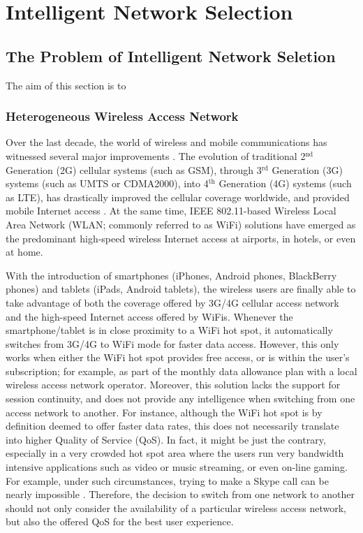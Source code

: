 \chapter{Intelligent Network Selection} %
\label{cha:intelligent}

\minitoc
\vspace{10mm}

\section{The Problem of Intelligent Network Seletion} %
\label{sec:the_problem_of_intelligent_network_seletion_intelligent}
The aim of this section is to 

\subsection{Heterogeneous Wireless Access Network} %
\label{sub:heterogeneous_wireless_access_network_intelligent}
Over the last decade, the world of wireless and mobile communications has witnessed several major improvements \cite{ABC03}. The evolution of traditional 2$^\text{nd}$ Generation (2G) cellular systems (such as GSM), through 3$^{\text{rd}}$ Generation (3G) systems (such as UMTS or CDMA2000), into 4$^{\text{th}}$ Generation (4G) systems (such as LTE), has drastically improved the cellular coverage worldwide, and provided mobile Internet access \cite{HossainBeaubrun09, HossainTalebiFard09}. At the same time, IEEE 802.11-based Wireless Local Area Network (WLAN; commonly referred to as WiFi) solutions have emerged as the predominant high-speed wireless Internet access at airports, in hotels, or even at home.

With the introduction of smartphones (iPhones, Android phones, BlackBerry phones) and tablets (iPads, Android tablets), the wireless users are finally able to take advantage of both the coverage offered by 3G/4G cellular access network and the high-speed Internet access offered by WiFis. Whenever the smartphone/tablet is in close proximity to a WiFi hot spot, it automatically switches from 3G/4G to WiFi mode for faster data access. However, this only works when either the WiFi hot spot provides free access, or is within the user's subscription; for example, as part of the monthly data allowance plan with a local wireless access network operator. Moreover, this solution lacks the support for session continuity, and does not provide any intelligence when switching from one access network to another. For instance, although the WiFi hot spot is by definition deemed to offer faster data rates, this does not necessarily translate into higher Quality of Service (QoS). In fact, it might be just the contrary, especially in a very crowded hot spot area where the users run very bandwidth intensive applications such as video or music streaming, or even on-line gaming. For example, under such circumstances, trying to make a Skype call can be nearly impossible \cite{Wisely4gWLAN09}. Therefore, the decision to switch from one network to another should not only consider the availability of a particular wireless access network, but also the offered QoS for the best user experience.

